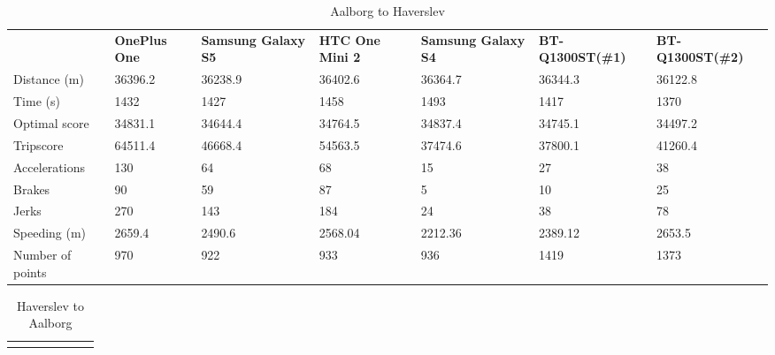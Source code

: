 \begin{landscape}
\begin{table*}[h]
\hspace{-2.5in}
\begin{minipage}{0.95\textwidth}
\caption{Aalborg to Haverslev}
\label{my-label}
\begin{tabular}{|l|llllll|}
\hline
\rowcolor{tablegreen}

                 & \textbf{OnePlus One} & \textbf{Samsung Galaxy S5} & \textbf{HTC One Mini 2} & \textbf{Samsung Galaxy S4} & \textbf{BT-Q1300ST(\#1)} & \textbf{BT-Q1300ST(\#2)} \\
Distance (m)     & 36396.2     & 36238.9           & 36402.6        & 36364.7           & 36344.3         & 36122.8         \\
Time (s)         & 1432        & 1427              & 1458           & 1493              & 1417            & 1370            \\
Optimal score    & 34831.1     & 34644.4           & 34764.5        & 34837.4           & 34745.1         & 34497.2         \\
Tripscore        & 64511.4     & 46668.4           & 54563.5        & 37474.6           & 37800.1         & 41260.4         \\
Accelerations    & 130         & 64                & 68             & 15                & 27              & 38              \\
Brakes           & 90          & 59                & 87             & 5                 & 10              & 25              \\
Jerks            & 270         & 143               & 184            & 24                & 38              & 78              \\
Speeding (m)     & 2659.4      & 2490.6            & 2568.04        & 2212.36           & 2389.12         & 2653.5          \\
Number of points & 970         & 922               & 933            & 936               & 1419            & 1373            \\\hline           
\end{tabular}
\end{minipage}
\end{table*}
\vspace{10 mm}
\begin{table*}[h]
\hspace{-2.5in}
\begin{minipage}{0.95\textwidth}
\caption{Haverslev to Aalborg}
\label{my-label}
\begin{tabular}{|l|llllll|}
\hline
\rowcolor{tablegreen}


\end{tabular}
\end{minipage}
\end{table*}
\end{landscape}
